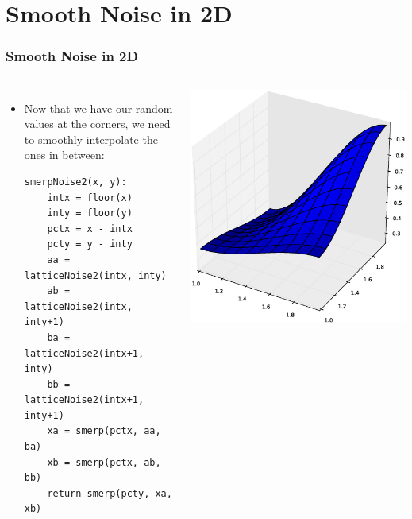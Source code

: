 \documentclass[slidestop,xcolor=pst,dvips]{beamer}
\newcommand{\sect}[1]{
\section{#1}
\begin{frame}[fragile]\frametitle{#1}
}
\begin{document}
\sect{Smooth Noise in 2D}
\begin{columns}[T]
\begin{itemize}
\item Now that we have our random values at the corners, we need to
  smoothly interpolate the ones in between:
\begin{verbatim}
smerpNoise2(x, y):
    intx = floor(x)
    inty = floor(y)
    pctx = x - intx
    pcty = y - inty
    aa = latticeNoise2(intx, inty)
    ab = latticeNoise2(intx, inty+1)
    ba = latticeNoise2(intx+1, inty)
    bb = latticeNoise2(intx+1, inty+1)
    xa = smerp(pctx, aa, ba)
    xb = smerp(pctx, ab, bb)
    return smerp(pcty, xa, xb)
\end{verbatim}
\end{itemize}
\includegraphics[width=\textwidth]{onesquaresurface.eps}
\end{columns}
\end{frame}
\end{document}
